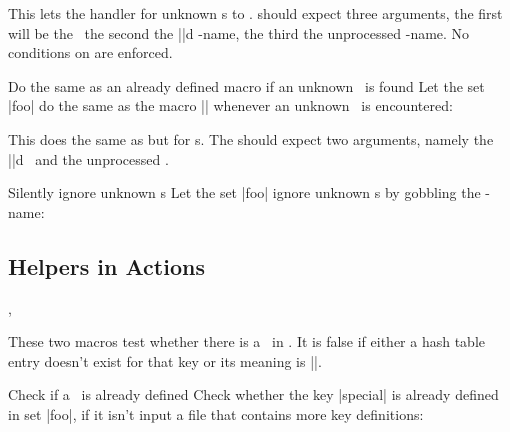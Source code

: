 \begin{function}{\ekvletunknown}
  \begin{syntax}
  \end{syntax}
  This lets the handler for unknown \Vkey{}s to .  should
  expect three arguments, the first will be the \val\ the second the
  |\detokenize|d \key-name, the third the unprocessed \key-name. No conditions
  on  are enforced.
\end{function}
\begin{example}
    {Do the same as an already defined macro if an unknown \Vkey\ is found}
  Let the set |foo| do the same as the macro |\foo@unknown| whenever an unknown
  \Vkey\ is encountered:
  \begin{enverb}[no-tcb]
    \foo@unknown
  \end{enverb}
\end{example}

\begin{function}{\ekvletunknownNoVal}
  \begin{syntax}
  \end{syntax}
  This does the same as  but for \Nkey{}s. The 
  should expect two arguments, namely the |\detokenize|d \key\ and the
  unprocessed \key.
\end{function}
\begin{example}{Silently ignore unknown \Nkey{}s}
  Let the set |foo| ignore unknown \Nkey{}s by gobbling the \key-name:
  \begin{enverb}[no-tcb]
    \@gobbletwo
  \end{enverb}
\end{example}

\subsection{Helpers in Actions}

\begin{function}{\ekvifdefined,\ekvifdefinedNoVal}
  \begin{syntax}
  \end{syntax}
  These two macros test whether there is a \key\ in \set. It is false if either
  a hash table entry doesn't exist for that key or its meaning is |\relax|.
\end{function}
\begin{example}{Check if a \Vkey\ is already defined}
  Check whether the key |special| is already defined in set |foo|, if it isn't
  input a file that contains more key definitions:
  \begin{enverb}[no-tcb]
  \end{enverb}
\end{example}

